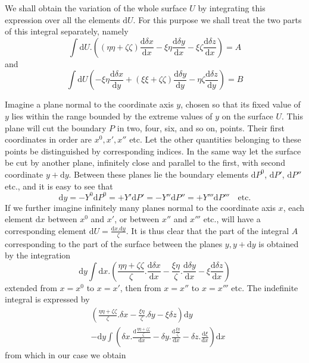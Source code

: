 We shall obtain the variation of the whole surface $U$ by integrating this expression over all the elements $\mathrm{d}U$. For this purpose we shall treat the two parts of this integral separately, namely
\[
\int\mathrm{d}U.((\eta\eta+\zeta\zeta)\frac{\mathrm{d}\delta x}{\mathrm{d}x}-\xi\eta\frac{\mathrm{d}\delta y}{\mathrm{d}x}-\xi\zeta\frac{\mathrm{d}\delta z}{\mathrm{d}x})=A
\]
and
\[
\int\mathrm{d}U(-\xi\eta\frac{\mathrm{d}\delta x}{\mathrm{d}y}+(\xi\xi+\zeta\zeta)\frac{\mathrm{d}\delta y}{\mathrm{d}y}-\eta\zeta\frac{\mathrm{d}\delta z}{\mathrm{d}y})=B
\]

Imagine a plane normal to the coordinate axis $y$, chosen so that its fixed value of $y$ lies within the range bounded by the extreme values of $y$ on the surface $U$. This plane will cut the boundary $P$ in two, four, six, and so on, points. Their first coordinates in order are $x^0,x',x''$ etc. Let the other quantities belonging to these points be distinguished by corresponding indices. In the same way let the surface be cut by another plane, infinitely close and parallel to the first, with second coordinate $y+\mathrm{d}y$. Between these planes lie the boundary elements $\mathrm{d}P^0$, $\mathrm{d}P'$, $\mathrm{d}P''$ etc., and it is easy to see that
\[
\mathrm{d}y=-Y^0\mathrm{d}P^0=+Y'\mathrm{d}P'=-Y''\mathrm{d}P''=+Y'''\mathrm{d}P'''\quad\text{etc.}
\]
If we further imagine infinitely many planes normal to the coordinate axis $x$, each element $\mathrm{d}x$ between $x^0$ and $x'$, or between $x''$ and $x'''$ etc., will have a corresponding element $\mathrm{d}U=\frac{\mathrm{d}x.\mathrm{d}y}{\zeta}$. It is thus clear that the part of the integral $A$ corresponding to the part of the surface between the planes $y,y+\mathrm{d}y$ is obtained by the integration
\[
\mathrm{d}y\int\mathrm{d}x.(\frac{\eta\eta+\zeta\zeta}{\zeta}.\frac{\mathrm{d}\delta x}{\mathrm{d}x}-\frac{\xi\eta}{\zeta}.\frac{\mathrm{d}\delta y}{\mathrm{d}x}-\xi\frac{\mathrm{d}\delta z}{\mathrm{d}x})
\]
extended from $x=x^0$ to $x=x'$, then from $x=x''$ to $x=x'''$ etc. The indefinite integral is expressed by
\[
\begin{aligned}
&(\frac{\eta\eta+\zeta\zeta}{\zeta}.\delta x-\frac{\xi\eta}{\zeta}.\delta y-\xi\delta z)\mathrm{d}y\\
&-\mathrm{d}y\int(\delta x.\frac{\mathrm{d}\frac{\eta\eta+\zeta\zeta}{\zeta}}{\mathrm{d}x}-\delta y.\frac{\mathrm{d}\frac{\xi\eta}{\zeta}}{\mathrm{d}x}-\delta z.\frac{\mathrm{d}\xi}{\mathrm{d}x})\mathrm{d}x
\end{aligned}
\]
from which in our case we obtain
